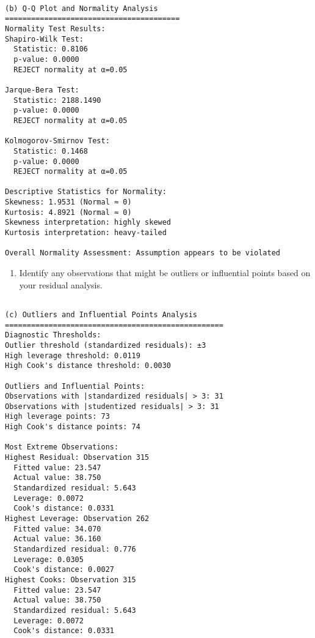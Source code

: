 \documentclass[8pt, twocolumn]{extarticle}
\providecommand{\tightlist}{%
      \setlength{\itemsep}{0pt}\setlength{\parskip}{0pt}}
\begin{document}
    \begin{Verbatim}[commandchars=\\\{\}]

(b) Q-Q Plot and Normality Analysis
========================================
Normality Test Results:
Shapiro-Wilk Test:
  Statistic: 0.8106
  p-value: 0.0000
  REJECT normality at α=0.05

Jarque-Bera Test:
  Statistic: 2188.1490
  p-value: 0.0000
  REJECT normality at α=0.05

Kolmogorov-Smirnov Test:
  Statistic: 0.1468
  p-value: 0.0000
  REJECT normality at α=0.05

Descriptive Statistics for Normality:
Skewness: 1.9531 (Normal ≈ 0)
Kurtosis: 4.8921 (Normal ≈ 0)
Skewness interpretation: highly skewed
Kurtosis interpretation: heavy-tailed

Overall Normality Assessment: Assumption appears to be violated
    \end{Verbatim}

    \begin{enumerate}
\def\labelenumi{(\alph{enumi})}
\setcounter{enumi}{2}
\tightlist
\item
  Identify any observations that might be outliers or influential points
  based on your residual analysis.
\end{enumerate}

    \begin{Verbatim}[commandchars=\\\{\}]

(c) Outliers and Influential Points Analysis
==================================================
Diagnostic Thresholds:
Outlier threshold (standardized residuals): ±3
High leverage threshold: 0.0119
High Cook's distance threshold: 0.0030

Outliers and Influential Points:
Observations with |standardized residuals| > 3: 31
Observations with |studentized residuals| > 3: 31
High leverage points: 73
High Cook's distance points: 74

Most Extreme Observations:
Highest Residual: Observation 315
  Fitted value: 23.547
  Actual value: 38.750
  Standardized residual: 5.643
  Leverage: 0.0072
  Cook's distance: 0.0331
Highest Leverage: Observation 262
  Fitted value: 34.070
  Actual value: 36.160
  Standardized residual: 0.776
  Leverage: 0.0305
  Cook's distance: 0.0027
Highest Cooks: Observation 315
  Fitted value: 23.547
  Actual value: 38.750
  Standardized residual: 5.643
  Leverage: 0.0072
  Cook's distance: 0.0331
    \end{Verbatim}
\end{document}
